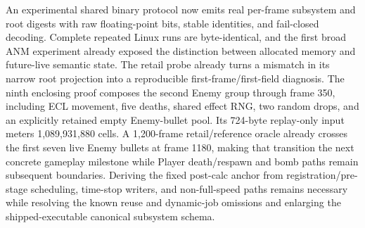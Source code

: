 An experimental shared binary protocol now emits real per-frame subsystem and
root digests with raw floating-point bits, stable identities, and fail-closed
decoding.  Complete repeated Linux runs are byte-identical, and the first broad
ANM experiment already exposed the distinction between allocated memory and
future-live semantic state.  The retail probe already turns a mismatch in its
narrow root projection into a reproducible first-frame/first-field diagnosis.
The ninth enclosing proof composes the second Enemy group through frame 350,
including ECL movement, five deaths, shared effect RNG, two random drops, and
an explicitly retained empty Enemy-bullet pool.  Its 724-byte replay-only input
meters 1,089,931,880 cells.  A 1,200-frame retail/reference oracle already
crosses the first seven live Enemy bullets at frame 1180, making that transition
the next concrete gameplay milestone while Player death/respawn and bomb paths
remain subsequent boundaries.  Deriving the fixed
post-calc anchor from registration/pre-stage scheduling, time-stop writers, and
non-full-speed paths remains necessary while resolving the
known reuse and dynamic-job omissions and enlarging the shipped-executable
canonical subsystem schema.

